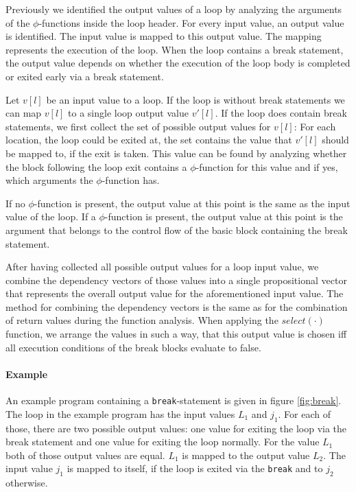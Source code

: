 Previously we identified the output values of a loop by analyzing the arguments of the $\phi$-functions inside the loop header. For every input value, an output value is identified. The input value is mapped to this output value. The mapping represents the execution of the loop. When the loop contains a break statement, the output value depends on whether the execution of the loop body is completed or exited early via a break statement.

Let $v[l]$ be an input value to a loop. If the loop is without break statements we can map $v[l]$ to a single loop output value $v'[l]$. If the loop does contain break statements, we first collect the set of possible output values for $v[l]$: For each location, the loop could be exited at, the set contains the value that $v'[l]$ should be mapped to, if the exit is taken. This value can be found by analyzing whether the block following the loop exit contains a $\phi$-function for this value and if yes, which arguments the $\phi$-function has.

If no $\phi$-function is present, the output value at this point is the same as the input value of the loop. If a $\phi$-function is present, the output value at this point is the argument that belongs to the control flow of the basic block containing the break statement.

After having collected all possible output values for a loop input value, we combine the dependency vectors of those values into a single propositional vector that represents the overall output value for the aforementioned input value. The method for combining the dependency vectors is the same as for the combination of return values during the function analysis. When applying the $select(\cdot)$ function, we arrange the values in such a way, that this output value is chosen iff all execution conditions of the break blocks evaluate to false.

\paragraph{Example}
An example program containing a \texttt{break}-statement is given in figure \ref{fig:break}. The loop in the example program has the input values $L_1$ and $j_1$. For each of those, there are two possible output values: one value for exiting the loop via the break statement and one value for exiting the loop normally. For the value $L_1$ both of those output values are equal. $L_1$ is mapped to the output value $L_2$. The input value $j_1$ is mapped to itself, if the loop is exited via the \texttt{break} and to $j_2$ otherwise.

